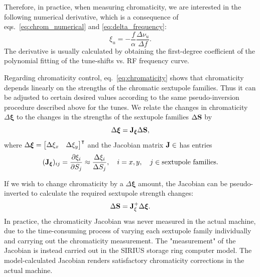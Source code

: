 Therefore, in practice, when measuring chromaticity, we are interested in the following numerical derivative, which is a consequence of eqs.~\eqref{eq:chrom_numerical} and \eqref{eq:delta_frequency}:
\begin{equation}
\xi_u = -\frac{f}{\alpha}\frac{\Delta \nu_u}{\Delta f}.
\end{equation}
The derivative is usually calculated by obtaining the first-degree coefficient of the polynomial fitting of the tune-shifts vs. RF frequency curve.

Regarding chromaticity control, eq.~\eqref{eq:chromaticity} shows that chromaticity depends linearly on the strengths of the chromatic sextupole families. Thus it can be adjusted to certain desired values according to the same pseudo-inversion procedure described above for the tunes. We relate the changes in chromaticity $\Delta \boldsymbol{\xi}$ to the changes in the strengths of the sextupole families $\Delta \vb{S}$ by
\begin{equation}
    \Delta\boldsymbol{\xi} = \vb{J}_{\boldsymbol{\xi}}\Delta \vb{S},
\end{equation}
where $\Delta\boldsymbol{\xi} = \mqty*[\Delta \xi_x & \Delta \xi_y]^\intercal$ and the Jacobian matrix $\vb{J}\in$ has entries
\begin{equation}
    (\vb{J}_{\boldsymbol{\xi}})_{ij} = \pdv{\xi_{i}}{S_j} \approx \frac{\Delta \xi_{i}}{\Delta S_j},\quad i=x, y, \quad j\in\text{sextupole families}.
\end{equation}

If we wish to change chromaticity by a $\Delta\boldsymbol{\xi}$ amount, the Jacobian can be pseudo-inverted to calculate the required sextupole strength changes:
\begin{equation}
    \Delta \vb{S} = \vb{J}_{\xi}^{+}\Delta \boldsymbol{\xi}.
\end{equation}
In practice, the chromaticity Jacobian was never measured in the actual machine, due to the time-consuming process of varying each sextupole family individually and carrying out the chromaticity measurement. The "measurement" of the Jacobian is instead carried out in the SIRIUS storage ring computer model. The model-calculated Jacobian renders satisfactory chromaticity corrections in the actual machine.

